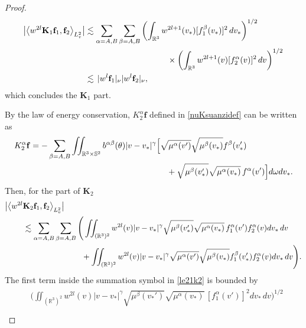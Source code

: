 \documentclass[reqno]{amsart}
\numberwithin{equation}{section}
\numberwithin{equation}{section}
\begin{document}
\begin{proof}
		\begin{align}
			\big|\big\langle w^{2l} \mathbf{K}_1 \mathbf{f}_1, \mathbf{f}_2 \big\rangle_{L^{2}_{v}}\big| &
			\lesssim \sum_{\alpha=A,B}\sum_{\beta=A,B}  \left( \int_{\mathbb{R}^3} w^{2l+1}(v_*) [f^\beta_1(v_*)]^2 \,dv_* \right)^{1/2} \notag\\
		 &\hspace{3.5cm}\times\left( \int_{\mathbb{R}^3} w^{2l+1}(v) [f^\alpha_2(v)]^2 \,dv \right)^{1/2}\notag\\
		 &\lesssim \, |w^{l}\mathbf{f}_1|_{\nu} |w^{l}\mathbf{f}_2|_{\nu},\label{K1PTlem21}
		\end{align}
		which concludes the $\mathbf{K}_1$ part.
		
		 By the law of energy conservation, $K_{2}^{\alpha} \mathbf{f}$ defined in \eqref{nuKsuanzidef} can be written as 
		\begin{equation*}
			\begin{split}
				&	 K_{2}^{\alpha} \mathbf{f}= - \sum_{\beta=A,B} \iint_{\mathbb{R}^3 \times \mathbb{S}^2}
				b^{\alpha\beta}(\theta)|v-v_*|^{\gamma}  \Big[\sqrt{\mu^\alpha(v')}\sqrt{\mu^\beta(v_*)}f^\beta(v_*')\\
				& \hspace{6.5cm} +\sqrt{\mu^{\beta}(v_*')} \sqrt{\mu^{\alpha}(v_*)}\, f^\alpha(v')\Big] d\omega dv_*.
			\end{split}	
		\end{equation*}	
		Then, for the part of $\mathbf{K}_2$
		\begin{gather}\label{le21k2}
		\begin{aligned}
			&\big|\big\langle w^{2l} \mathbf{K}_2 \mathbf{f}_1, \mathbf{f}_2 \big\rangle_{L^{2}_{v}}\big|\\
			& \hspace{0.8cm}\lesssim \sum_{\alpha=A,B}\sum_{\beta=A,B}  \Bigg(\iint_{(\mathbb{R}^3)^2 }w^{2l}(v)|v-v_*|^{\gamma}\sqrt{\mu^{\beta}(v_*')} \sqrt{\mu^{\alpha}(v_*)}\, f^\alpha_1(v')f^\alpha_2(v)dv_*\,dv\\
			&\hspace{3.4cm}+ \iint_{(\mathbb{R}^3)^2 }w^{2l}(v)|v-v_*|^{\gamma}\sqrt{\mu^\alpha(v')}\sqrt{\mu^\beta(v_*)}f^\beta_1(v_*')f^\alpha_2(v)dv_*\,dv\Bigg).
		\end{aligned}
		\end{gather}
		The first term inside the summation symbol in \eqref{le21k2} is bounded by
		\begin{gather}\label{lem21f1fc}
		\begin{aligned}
		&\Bigg(\iint_{(\mathbb{R}^3)^2 }w^{2l}(v)|v-v_*|^{\gamma}\sqrt{\mu^{\beta}(v_*')} \sqrt{\mu^{\alpha}(v_*)}\, [f^\alpha_1(v')]^2dv_*\,dv \Bigg)^{1/2} \\

\end{aligned}
\end{gather}
\end{proof}
\end{document}
